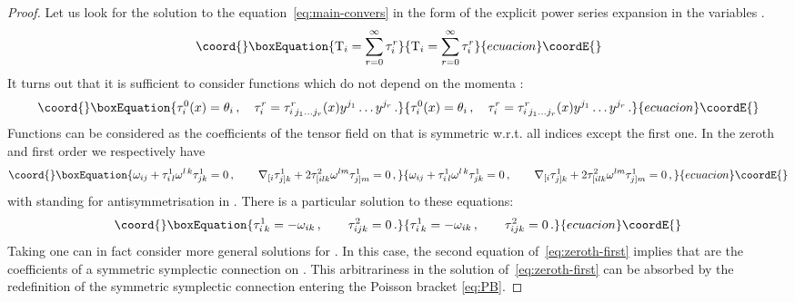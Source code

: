 \documentclass[a4paper,11pt,oneside]{amsart}
\theoremstyle{plain}
\numberwithin{equation}{section} %
\numberwithin{figure}{section} %
\def\cT{{\rm T}}
\def\manM{{\mathcal M}}
\begin{document}
\begin{proof}
Let us look for the solution to the equation~\eqref{eq:main-convers}
in the form of the explicit power series expansion
in the variables \coordHE{}.
\begin{equation}\coord{}\boxEquation{
\label{eq:expansion}
\cT_i=\sum^\infty_{r=0} \tau^r_i
}{
\cT_i=\sum^\infty_{r=0} \tau^r_i
}{ecuacion}\coordE{}\end{equation}
It turns out that it is sufficient to consider functions
\coordHE{} which do not depend on the momenta \coordHE{}:
\begin{equation}\coord{}\boxEquation{
\tau^0_i(x)=\theta_i\,, \quad
\tau^r_i=\tau^r_{i\, j_1\ldots
j_r}(x)y^{j_1}\ldots y^{j_r}\,.
}{
\tau^0_i(x)=\theta_i\,, \quad
\tau^r_i=\tau^r_{i\, j_1\ldots
j_r}(x)y^{j_1}\ldots y^{j_r}\,.
}{ecuacion}\coordE{}\end{equation}
Functions \coordHE{} can
be considered as the coefficients of the tensor field
on \myHighlight{$\manM$}\coordHE{} that is symmetric w.r.t. all indices except
the first one.  In the zeroth and first order we
respectively have
\begin{equation}\coord{}\boxEquation{
\label{eq:zeroth-first}
\omega_{ij}+\tau^1_{i\,l} \omega^{l\,k}\tau^1_{jk}=0\,,
\qquad
\nabla_{[i}\tau^1_{j]k}+2\tau^2_{[ilk}\omega^{lm}\tau^1_{j]m}=0\, ,
}{
\omega_{ij}+\tau^1_{i\,l} \omega^{l\,k}\tau^1_{jk}=0\,,
\qquad
\nabla_{[i}\tau^1_{j]k}+2\tau^2_{[ilk}\omega^{lm}\tau^1_{j]m}=0\, ,
}{ecuacion}\coordE{}\end{equation}
with \myHighlight{$[i,j]$}\coordHE{} standing for antisymmetrisation in \coordHE{}.
There is a particular solution to these equations:
\begin{equation}\coord{}\boxEquation{
\tau^1_{i\,k}=-\omega_{ik}\,,\qquad \tau^2_{ijk}=0\,.
\label{eq:tau-particular}
}{
\tau^1_{i\,k}=-\omega_{ik}\,,\qquad \tau^2_{ijk}=0\,.
}{ecuacion}\coordE{}\end{equation}
Taking \coordHE{} one can in fact
consider more general solutions for \coordHE{}. In this case,
the second equation of~\eqref{eq:zeroth-first} implies that
\coordHE{} are the coefficients of a symmetric
symplectic connection on \myHighlight{$\manM$}\coordHE{}. This arbitrariness
in the solution of~\eqref{eq:zeroth-first} can be absorbed
by the redefinition of the symmetric symplectic connection
entering the Poisson bracket \eqref{eq:PB}.


\end{proof}
\end{document}
